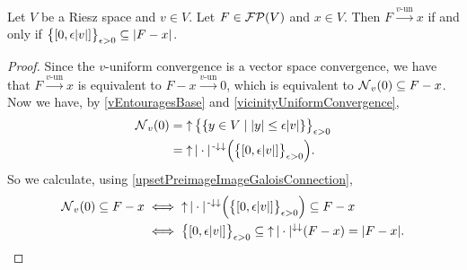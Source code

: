 \begin{lemma}
Let $V$ be a Riesz space and $v\in V$. Let $F\in \operatorname{\mathcal{FP}}(V)$ and $x\in V$. Then $F\overset{\text{$v$-un}}{\longrightarrow} x$ \textup{if and only if} $\big\{\interval{0,\epsilon|v|}\big\}_{\epsilon>0} \subseteq |F - x|$.
\end{lemma}
\begin{proof}
Since the $v$-uniform convergence is a vector space convergence, we have that $F\overset{\text{$v$-un}}{\longrightarrow} x$ is equivalent to $F-x\overset{\text{$v$-un}}{\longrightarrow} 0$, which is equivalent to $\operatorname{\mathcal{N}}_v(0) \subseteq F-x$. Now we have, by \ref{vEntouragesBase} and \ref{vicinityUniformConvergence},
\begin{align*}
\neighbourhoods_v(0) &= \upset\big\{ \setbuilder{y\in V}{|y| \leq \epsilon |v|} \big\}_{\epsilon > 0} \\
&= \upset|\cdot|^{\preimf\imf}\Big(\big\{ \interval{0, \epsilon |v|} \big\}_{\epsilon > 0}\Big).
\end{align*}
So we calculate, using \ref{upsetPreimageImageGaloisConnection},
\begin{align*}
\neighbourhoods_v(0) \subseteq F-x &\iff \upset|\cdot|^{\preimf\imf}\Big(\big\{ \interval{0, \epsilon |v|} \big\}_{\epsilon > 0}\Big) \subseteq F-x \\
&\iff \big\{ \interval{0, \epsilon |v|} \big\}_{\epsilon > 0} \subseteq \upset |\cdot|^{\imf\imf}(F-x) = |F-x|.
\end{align*}
\end{proof}

